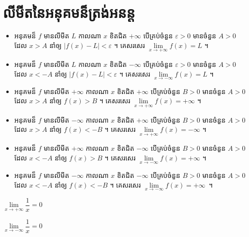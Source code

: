 \documentclass[a5paper,leqno,fleqn]{book}
\begin{document}
\section{លីមីតនៃអនុគមន៏ត្រង់អនន្ត}
\begin{definition}{}{}
	\begin{itemize}
	\item អនុគមន៏ $ f $ មានលីមីត $ L $ កាលណា $ x $ ខិតជិត $ +\infty $ បើគ្រប់ចំនួន $ \varepsilon>0 $ មានចំនួន $ A>0 $ ដែល $ x>A $ នាំឲ្យ $ |f(x)-L|<\varepsilon $ ។ គេសរសេរ $ \lim\limits_{x\to+\infty}f(x)=L $ ។
	\item អនុគមន៏ $ f $ មានលីមីត $ L $ កាលណា $ x $ ខិតជិត $ -\infty $ បើគ្រប់ចំនួន $ \varepsilon>0 $ មានចំនួន $ A>0 $ ដែល $ x<-A $ នាំឲ្យ $ |f(x)-L|<\varepsilon $ ។ គេសរសេរ $ \lim\limits_{x\to-\infty}f(x)=L $ ។
	\item អនុគមន៏ $ f $ មានលីមីត $ +\infty $ កាលណា $ x $ ខិតជិត $ +\infty $ បើគ្រប់ចំនួន $ B>0 $ មានចំនួន $ A>0 $ ដែល $ x>A $ នាំឲ្យ $ f(x)>B $ ។ គេសរសេរ $ \lim\limits_{x\to+\infty}f(x)=+\infty $ ។
	\item អនុគមន៏ $ f $ មានលីមីត $ -\infty $ កាលណា $ x $ ខិតជិត $ +\infty $ បើគ្រប់ចំនួន $ B>0 $ មានចំនួន $ A>0 $ ដែល $ x>A $ នាំឲ្យ $ f(x)<-B $ ។ គេសរសេរ $ \lim\limits_{x\to+\infty}f(x)=-\infty $ ។
	\item អនុគមន៏ $ f $ មានលីមីត $ +\infty $ កាលណា $ x $ ខិតជិត $ -\infty $ បើគ្រប់ចំនួន $ B>0 $ មានចំនួន $ A>0 $ ដែល $ x<-A $ នាំឲ្យ $ f(x)>B $ ។ គេសរសេរ $ \lim\limits_{x\to-\infty}f(x)=+\infty $ ។
	\item អនុគមន៏ $ f $ មានលីមីត $ -\infty $ កាលណា $ x $ ខិតជិត $ -\infty $ បើគ្រប់ចំនួន $ B>0 $ មានចំនួន $ A>0 $ ដែល $ x<-A $ នាំឲ្យ $ f(x)<-B $ ។ គេសរសេរ $ \lim\limits_{x\to-\infty}f(x)=+\infty $~។
	\end{itemize}
\end{definition}
\begin{generality}{}{}
	\begin{itemize}
	\end{itemize}
\end{generality}
\end{document}
